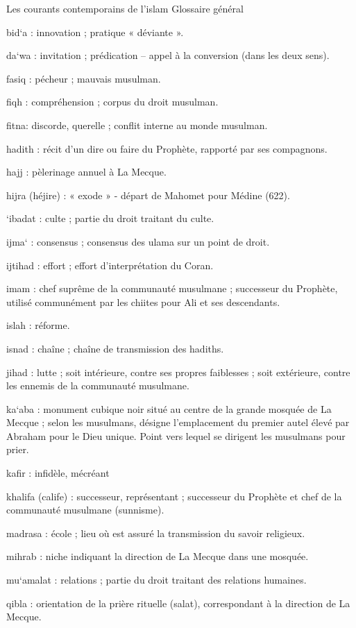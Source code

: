 Les courants contemporains de l’islam Glossaire général


bid‘a : innovation ; pratique « déviante ».

da‘wa : invitation ; prédication – appel à la conversion (dans les deux sens).

fasiq : pécheur ; mauvais musulman.

fiqh : compréhension ; corpus du droit musulman.

fitna: discorde, querelle ; conflit interne au monde musulman.

hadith : récit d’un dire ou faire du Prophète, rapporté par ses compagnons.

hajj : pèlerinage annuel à La Mecque.

hijra (héjire) : « exode » - départ de Mahomet pour Médine (622).

‘ibadat : culte ; partie du droit traitant du culte.

ijma‘ : consensus ; consensus des ulama sur un point de droit.

ijtihad : effort ; effort d’interprétation du Coran.

imam : chef suprême de la communauté musulmane ; successeur du Prophète, utilisé communément par les chiites pour Ali et ses descendants.

islah : réforme.

isnad : chaîne ; chaîne de transmission des hadiths.

jihad : lutte ; soit intérieure, contre ses propres faiblesses ; soit extérieure, contre les ennemis de la communauté musulmane.

ka‘aba : monument cubique noir situé au centre de la grande mosquée de La Mecque ; selon les musulmans, désigne l’emplacement du premier autel élevé par Abraham pour le Dieu unique. Point vers lequel se dirigent les musulmans pour prier.

kafir : infidèle, mécréant

khalifa (calife) : successeur, représentant ; successeur du Prophète et chef de la communauté musulmane (sunnisme).

madrasa : école ; lieu où est assuré la transmission du savoir religieux.

mihrab : niche indiquant la direction de La Mecque dans une mosquée.
 
mu‘amalat : relations ; partie du droit traitant des relations humaines.

qibla : orientation de la prière rituelle (salat), correspondant à la direction de La Mecque.

